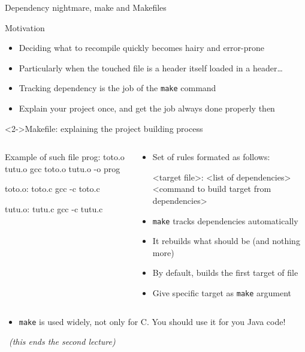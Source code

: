 \begin{frame}[fragile]{Dependency nightmare, make and Makefiles}
  \vspace{-.5\baselineskip}
  \begin{block}{Motivation}
    \begin{itemize}
    \item Deciding what to recompile quickly becomes hairy and error-prone
    \item Particularly when the touched file is a header itself loaded in a header\ldots
    \item Tracking dependency is the job of the \texttt{make} command
    \item Explain your project once, and get the job always done properly then
    \end{itemize}
  \end{block}\vspace{-.5\baselineskip}

  \begin{block}<2->{Makefile: explaining the project building process}    
  \begin{columns}
    \begin{column}{.36\linewidth}\medskip
  \begin{boitecode}{Example of such file}
prog: toto.o tutu.o
    gcc toto.o tutu.o -o prog

toto.o: toto.c 
    gcc -c toto.c

tutu.o: tutu.c
    gcc -c tutu.c    
  \end{boitecode}      
    \end{column}
    \begin{column}{.62\linewidth}
      \begin{itemize}
      \item<2-> Set of rules formated as follows:
        {  \footnotesize
        \begin{semiverbatim}
<target file>: <list of dependencies>
    <command to build target from dependencies>
        \end{semiverbatim}}\vspace{-.7\baselineskip}
      \item<3-> \texttt{make} tracks dependencies automatically
      \item<3-> It rebuilds what should be (and nothing more)
      \item<3-> By default, builds the first target of file
      \item<3-> Give specific target as \texttt{make} argument
      \end{itemize}
    \end{column}
  \end{columns}
  \end{block}
  \begin{itemize}
  \item<4-> \texttt{make} is used widely, not only for C. You should use it for you Java code!
  \end{itemize}

  ~\hfill\textit{(this ends the second lecture)}
\end{frame}
\toc